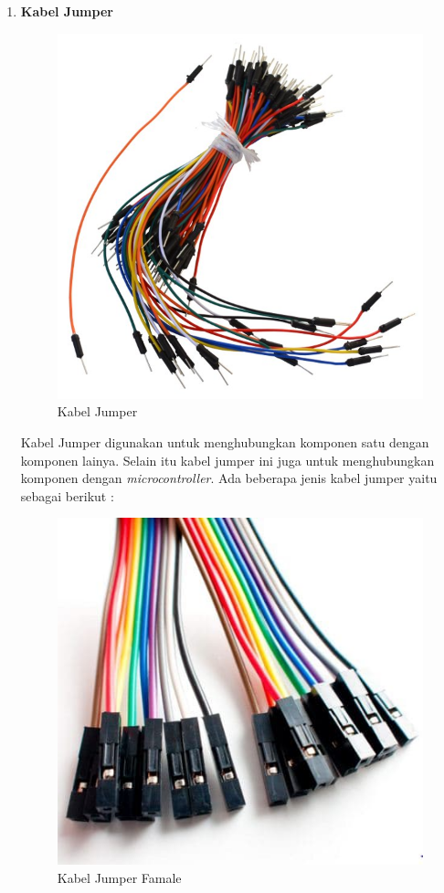 \begin{enumerate}
\item \textbf{ Kabel Jumper}
\begin{figure}[H]
\centering
\includegraphics[width=1\textwidth]{figures/kabel.jpg}
\caption{Kabel Jumper}
\label{print}
\end{figure}

\par Kabel Jumper digunakan untuk menghubungkan komponen satu dengan komponen lainya. Selain itu kabel jumper ini juga untuk menghubungkan komponen dengan \textit{microcontroller}. Ada beberapa jenis kabel jumper yaitu sebagai berikut :


\begin{figure}[H]
\centering
\includegraphics[width=1\textwidth]{figures/famel.jpg}
\caption{Kabel Jumper Famale}
\label{print}
\end{figure}


\end{enumerate}
